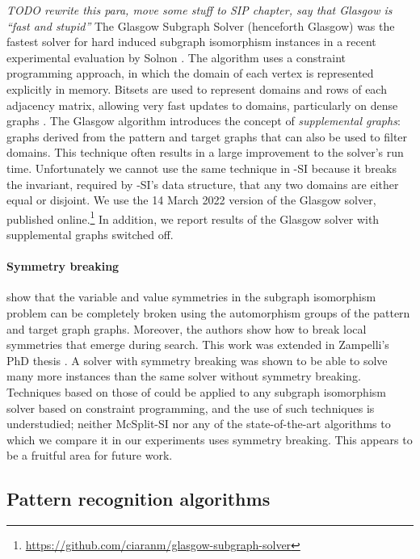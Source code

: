 \emph{TODO rewrite this para, move some stuff to SIP chapter, say that Glasgow
is ``fast and stupid''}
The Glasgow Subgraph Solver \cite{DBLP:conf/cp/McCreeshP15,DBLP:conf/gg/McCreeshP020}
(henceforth Glasgow)
was the fastest solver for hard induced subgraph isomorphism instances in a recent
experimental evaluation by Solnon \cite{DBLP:conf/gbrpr/Solnon19}.  The algorithm
uses a constraint programming approach, in which the domain of each vertex is represented
explicitly in memory.  Bitsets are used to represent domains and rows of each adjacency
matrix, allowing very fast updates to domains, particularly on dense graphs
\cite{ullmann1976algorithm}.  The Glasgow algorithm introduces the concept of
\emph{supplemental graphs}: graphs derived from the pattern and target graphs that
can also be used to filter domains.  This technique often results in a large
improvement to the solver's run time.  Unfortunately we cannot use the same technique
in \McSplit-SI because it breaks the invariant, required by \McSplit-SI's data structure,
that any two domains are either equal or disjoint.
We use the 14 March 2022 version of the Glasgow solver, published
online.\footnote{\url{https://github.com/ciaranm/glasgow-subgraph-solver}}
In addition, we report results of the Glasgow solver with supplemental graphs
switched off.

\paragraph*{Symmetry breaking}
\citet{zampelli2007symmetry} show that the variable and value symmetries
in the subgraph isomorphism problem can be completely broken using
the automorphism groups of the pattern and target graph graphs.
Moreover, the authors show how to break local symmetries that emerge
during search.
This work was extended in Zampelli's PhD thesis \citep{DBLP:phd/basesearch/Zampelli08}.
A solver with symmetry breaking was shown to be able to solve many more instances
than the same solver without symmetry breaking. 
Techniques based on those of \citeauthor{zampelli2007symmetry} 
could be applied to any subgraph isomorphism solver based on constraint programming,
and the use of such techniques is understudied; neither McSplit-SI nor any of
the state-of-the-art algorithms to which we compare it in our experiments
uses symmetry breaking.  This appears to be a fruitful area for future
work.

\subsection{Pattern recognition algorithms}

